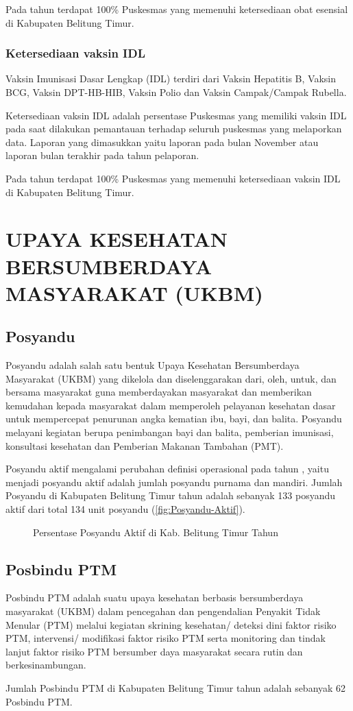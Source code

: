 Pada tahun \tP terdapat 100\% Puskesmas yang memenuhi ketersediaan obat esensial di Kabupaten Belitung Timur.

\subsubsection{Ketersediaan vaksin IDL}
Vaksin Imunisasi Dasar Lengkap (IDL) terdiri dari Vaksin Hepatitis B, Vaksin BCG, Vaksin DPT-HB-HIB, Vaksin Polio dan Vaksin Campak/Campak Rubella.

Ketersediaan vaksin IDL adalah persentase Puskesmas yang memiliki vaksin IDL pada saat dilakukan pemantauan terhadap seluruh puskesmas yang melaporkan data. Laporan yang dimasukkan yaitu laporan pada bulan November atau laporan bulan terakhir pada tahun pelaporan.

Pada tahun \tP terdapat 100\% Puskesmas yang memenuhi ketersediaan vaksin IDL di Kabupaten Belitung Timur.


\section[UKBM]{UPAYA KESEHATAN BERSUMBERDAYA MASYARAKAT (UKBM)}%
\subsection{Posyandu}
Posyandu adalah salah satu bentuk Upaya Kesehatan Bersumberdaya Masyarakat (UKBM) yang dikelola dan diselenggarakan dari, oleh, untuk, dan bersama masyarakat guna memberdayakan masyarakat dan memberikan kemudahan kepada masyarakat dalam memperoleh pelayanan kesehatan dasar untuk mempercepat penurunan angka kematian ibu, bayi, dan balita. Posyandu melayani kegiatan berupa penimbangan bayi dan balita, pemberian imunisasi, konsultasi kesehatan dan Pemberian Makanan Tambahan (PMT).

Posyandu aktif mengalami perubahan definisi operasional pada tahun \tP , yaitu menjadi posyandu aktif adalah jumlah posyandu purnama dan mandiri. Jumlah Posyandu di Kabupaten Belitung Timur tahun \tP adalah sebanyak 133 posyandu aktif dari total 134 unit posyandu (\autoref{fig:Posyandu-Aktif}).

\begin{figure}[H]
	\centering{}
	\caption{Persentase Posyandu Aktif di Kab. Belitung Timur Tahun \tP}
	\label{fig:Posyandu-Aktif}
\end{figure}

\subsection{Posbindu PTM}
Posbindu PTM adalah suatu upaya kesehatan berbasis bersumberdaya masyarakat (UKBM) dalam pencegahan dan pengendalian Penyakit Tidak Menular (PTM) melalui kegiatan skrining kesehatan/ deteksi dini faktor risiko PTM, intervensi/ modifikasi faktor risiko PTM serta monitoring dan tindak lanjut faktor risiko PTM bersumber daya masyarakat secara rutin dan berkesinambungan.

Jumlah Posbindu PTM di Kabupaten Belitung Timur tahun \tP adalah sebanyak 62 Posbindu PTM. %
